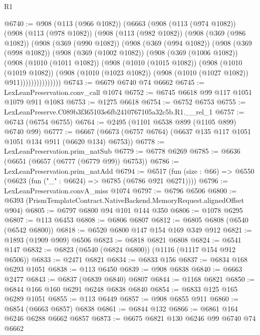 \begin{lexlean}{R1}
\begin{coremodule}
@6740 := @908
    (@113 (@966 @1082))
    (@6663
      (@908
        (@113 (@974 @1082))
        (@908
          (@113 (@978 @1082))
          (@908
            (@113 (@982 @1082))
            (@908
              (@369 (@986 @1082))
              (@908
                (@369 (@990 @1082))
                (@908
                  (@369 (@994 @1082))
                  (@908
                    (@369 (@998 @1082))
                    (@908
                      (@369 (@1002 @1082))
                      (@908
                        (@369 (@1006 @1082))
                        (@908
                          (@1010 (@1011 @1082))
                          (@908
                            (@1010 (@1015 @1082))
                            (@908
                              (@1010 (@1019 @1082))
                              (@908
                                (@1010 (@1023 @1082))
                                (@908 (@1010 (@1027 @1082)) @911)))))))))))))))
@6743 := @6679 @6740 @74 @6662
@6745 := LexLeanPreservation.conv_call @1074
@6752 := @6745 @6618 @99 @117 @1051 @1079 @911 @1083
@6753 := @1275 @6618
@6754 := @6752 @6753
@6755 := LexLeanPreserve.C089b3f365103e6fb2410767105a32c5b.R1.__rel_1
@6757 := @6743 (@6754 @6755)
@6764 := @2495 (@1101 @6538 @899 (@1105 @899) @6740 @99)
@6777 := @6667 (@6673 (@6757 @6764) (@6637 @135 @117 @1051 @1051 @134 @911 (@6620 @134) @6753))
@6778 := LexLeanPreservation.prim_natSub
@6779 := @6778 @6269
@6785 := @6636 (@6651 (@6657 (@6777 (@6779 @99)) @6753))
@6786 := LexLeanPreservation.prim_natAdd
@6794 := @6517 (fun (size : @66) => @6550 (@6623 (fun ("_" : @6624) => @6785 (@6786 @921 @6271))))
@6796 := LexLeanPreservation.convA_miss @1074
@6797 := @6796 @6506
@6800 := @6393 (PrismTemplateContract.NativeBackend.MemoryRequest.alignedOffset @904)
@6805 := @6797 @6800 @94 @101 @144 @350
@6806 := @1078 @6295
@6807 := @113 @6453
@6808 := @6806 @6807
@6812 := @6805 @6808 (@6540 (@6542 @6800))
@6818 := @6520 @6800 @147 @154 @169 @349 @912
@6821 := @1893 (@1909 @909) @6506
@6823 := @6818 @6821 @6808
@6824 := @6541 @147
@6832 := @6823 (@6540 (@6824 @6800)) (@1116 (@1117 @154 @912 @6506))
@6833 := @2471 @6821
@6834 := @6833 @156
@6837 := @6834 @168 @6293 @1051
@6838 := @113 @6450
@6839 := @908 @6838
@6840 := @6663 @2477
@6843 := @6837 (@6839 @6840) @6807
@6844 := @1168 @6821
@6850 := @6844 @166 @160 @6291 @6248 @6838 @6840
@6854 := @6833 @125 @165 @6289 @1051
@6855 := @113 @6449
@6857 := @908 @6855 @911
@6860 := @6854 (@6663 @6857) @6838
@6861 := @6844 @132
@6866 := @6861 @164 @6246 @6288 @6662 @6857
@6873 := @6675 @6821 @130 @6246 @99 @6740 @74 @6662

\end{coremodule}
\end{lexlean}
